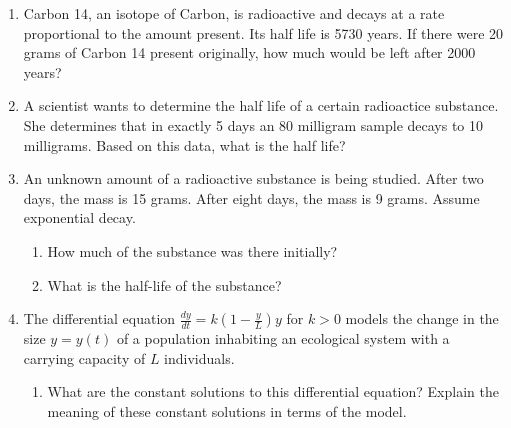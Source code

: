 \documentclass[12pt]{article}
\newif\ifans
\begin{document}
\begin{enumerate}
\begin{enumerate}
\end{enumerate}

\item Carbon 14, an isotope of Carbon, is radioactive and decays at a rate proportional to the amount present.  Its half life is 5730 years.  If there were 20 grams of Carbon 14 present originally, how much would be left after 2000 years?

\ifans{\fbox{$y(t)=20(2)^{-t/5730}$.  Thus, $y(2000)=20(2)^{-2000/5730}\approx 15.702$ grams.}} \fi

\item A scientist wants to determine the half life of a certain radioactice substance.  She determines that in exactly 5 days an 80 milligram sample decays to 10 milligrams.  Based on this data, what is the half life?

\ifans{\fbox{$\frac{5}{3}$ days; Detailed Solution: \textcolor{blue}{\href{http://www.math.drexel.edu/classes/Calculus/resources/Math123HW/Solutions/123_02_Modeling_07.pdf}{Here}}}} \fi 

\item An unknown amount of a radioactive substance is being studied.  After two days, the mass is 15 grams.  After eight days, the mass is 9 grams.  Assume exponential decay.

\begin{enumerate}

\item How much of the substance was there initially?

\ifans{\fbox{$y_0 = 9\left(\frac{3}{5}\right)^{-4/3}\approx 17.78$ grams}} \fi

\item What is the half-life of the substance?

\ifans{\fbox{$T_{1/2}=-\frac{6\ln{2}}{\ln{\left(\frac{9}{15}\right)}}\approx 8.14$ days}} \fi

\end{enumerate}

\item The differential equation $\frac{dy}{dt}=k\left(1-\frac{y}{L}\right)y$ for $k>0$ models the change in the size $y=y(t)$ of a population inhabiting an ecological system with a carrying capacity of $L$ individuals.

\begin{enumerate}

\item What are the constant solutions to this differential equation?  Explain the meaning of these constant solutions in terms of the model.


\end{enumerate}
\end{enumerate}
\end{document}

